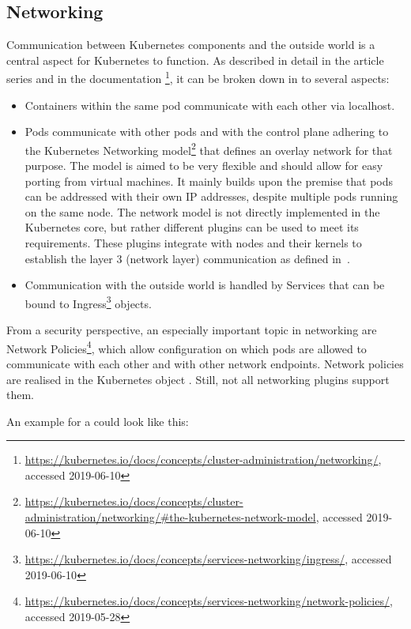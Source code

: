 \subsection{Networking} \label{ssec:networking}

Communication between Kubernetes components and the outside world is a central aspect for Kubernetes to function. As described in detail in the article series \textcite{NetworkingExplained} and in the documentation \textcite{k8sdocs}\footnote{\url{https://kubernetes.io/docs/concepts/cluster-administration/networking/}, accessed 2019-06-10}, it can be broken down in to several aspects:

\begin{itemize}
    \item Containers within the same pod communicate with each other via localhost.
    \item Pods communicate with other pods and with the control plane adhering to the Kubernetes Networking model\footnote{\url{https://kubernetes.io/docs/concepts/cluster-administration/networking/\#the-kubernetes-network-model}, accessed 2019-06-10} that defines an overlay network for that purpose. The model is aimed to be very flexible and should allow for easy porting from virtual machines. It mainly builds upon the premise that pods can be addressed with their own IP addresses, despite multiple pods running on the same node. The network model is not directly implemented in the Kubernetes core, but rather different plugins can be used to meet its requirements. These plugins integrate with nodes and their kernels to establish the layer 3 (network layer) communication as defined in~\textcite{osiModel}.
    \item Communication with the outside world is handled by Services that can be bound to  Ingress\footnote{\url{https://kubernetes.io/docs/concepts/services-networking/ingress/}, accessed 2019-06-10} objects. %
\end{itemize}

From a security perspective, an especially important topic in networking are Network Policies\footnote{\url{https://kubernetes.io/docs/concepts/services-networking/network-policies/}, accessed 2019-05-28}, which allow configuration on which pods are allowed to communicate with each other and with other network endpoints. Network policies are realised in the Kubernetes object . Still, not all networking plugins support them.

An example for a  could look like this:

